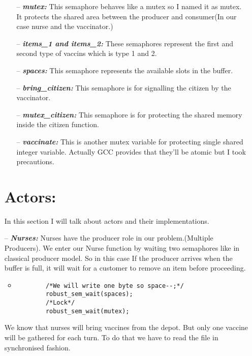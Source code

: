 \documentclass{article}
\begin{document}
\begin{itemize}
\begin{itemize}
\item[--] \textbf{\textit{mutex:}} This semaphore behaves like a mutex so I named it as mutex. It protects the shared area between the producer and consumer(In our case nurse and the vaccinator.)

\item[--] \textbf{\textit{items\_1 and items\_2:}}
These semaphores represent the first and second  type of vaccins which is type 1 and 2.
\item[--] \textbf{\textit{spaces:}}
This semaphore represents the available slots in the buffer.
\item[--] \textbf{\textit{bring\_citizen:}}
This semaphore is for signalling the citizen by the vaccinator.
\item[--] \textbf{\textit{mutex\_citizen:}}
This semaphore is for protecting the shared memory inside the citizen function.
\item[--] \textbf{\textit{vaccinate:}}
This is another mutex variable for protecting single shared integer variable. Actually GCC provides that they'll be atomic but I took precautions.

\end{itemize}


\section{Actors:}

In this section I will talk about actors and their implementations.
 
\item[--] \textbf{\textit{Nurses:}} Nurses have the producer role in our problem.(Multiple Producers). We enter our Nurse function by waiting two semaphores like in classical producer model. So in this case If the producer arrives when the buffer is full, it will wait for a customer to remove an item before proceeding.

\begin{itemize}
  \item 
    \begin{lstlisting}
        /*We will write one byte so space--;*/
        robust_sem_wait(spaces); 
        /*Lock*/
        robust_sem_wait(mutex);

    \end{lstlisting}
\end{itemize}

\quad We know that nurses will bring vaccines from the depot. But only one vaccine will be gathered for each turn. To do that we have to read the file in synchronised fashion. 


\end{itemize}
\end{document}
